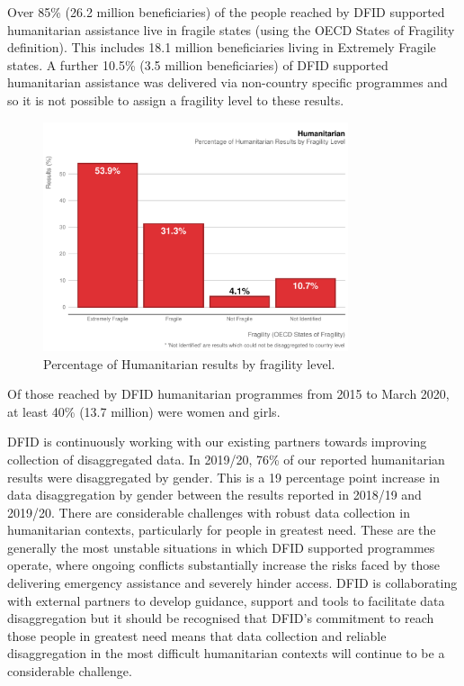 Over 85\% (26.2 million beneficiaries) of the people reached by DFID supported humanitarian assistance live in fragile states (using the OECD States of Fragility definition). %
This includes 18.1 million beneficiaries living in Extremely Fragile states. %
A further 10.5\% (3.5 million beneficiaries) of DFID supported humanitarian assistance was delivered via non-country specific programmes and so it is not possible to assign a fragility level to these results. %


\begin{figure}[htbp]
	\centering
	\includegraphics[width=0.8\textwidth]{../figs/human_fragility_plot} \hfill
	\caption{Percentage of Humanitarian results by fragility level.}
	\label{fig:human_fragility_plot}
\end{figure}


Of those reached by DFID humanitarian programmes from 2015 to March 2020, at least 40\% (13.7 million) were women and girls. %

DFID is continuously working with our existing partners towards improving collection of disaggregated data. %
In 2019/20, 76\% of our reported humanitarian results were disaggregated by gender. %
This is a 19 percentage point increase in data disaggregation by gender between the results reported in 2018/19 and 2019/20. %
There are considerable challenges with robust data collection in humanitarian contexts, particularly for people in greatest need. %
These are the generally the most unstable situations in which DFID supported programmes operate, where ongoing conflicts substantially increase the risks faced by those delivering emergency assistance and severely hinder access. %
DFID is collaborating with external partners to develop guidance, support and tools to facilitate data disaggregation but it should be recognised that DFID’s commitment to reach those people in greatest need means that data collection and reliable disaggregation in the most difficult humanitarian contexts will continue to be a considerable challenge. %


